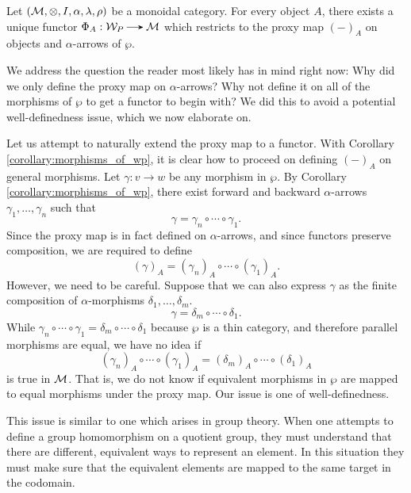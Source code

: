\begin{theorem}\label{theorem:coherence_in_alpha}
    Let $(\mathcal{M}, \otimes, I, \alpha, \lambda, \rho)$ be a monoidal category. 
    For every object $A$, there exists a unique functor 
    $\Phi_A: \ww_P \to \mm$ which restricts to the proxy map 
    $(-)_A$ on objects and $\alpha$-arrows of $\wp$. 
\end{theorem}

We address the question the reader most likely has in mind right now: 
Why did we only define the proxy map on $\alpha$-arrows? Why  not 
define it on all of the morphisms of $\wp$ to get a 
functor to begin with? 
We did this to avoid a potential well-definedness issue, which we 
now elaborate on.

Let us attempt to naturally extend the proxy map to a functor.
With Corollary \ref{corollary:morphisms_of_wp}, it is
clear how to proceed on 
defining $(-)_A$ on general morphisms. 
Let  $\gamma: v \to w$ be any morphism in $\wp$. 
By Corollary \ref{corollary:morphisms_of_wp}, 
there exist forward and backward $\alpha$-arrows 
$\gamma_1, \dots, \gamma_n$ such  that  
\[
    \gamma = \gamma_n \circ \cdots \circ \gamma_1.
\]
Since the proxy map is in fact defined on $\alpha$-arrows, and since 
functors preserve composition,
we are required to define
\[
    (\gamma)_A = (\gamma_n)_A\circ \cdots \circ (\gamma_1)_A.
\]
However, we need to be careful. Suppose that we can also 
express $\gamma$ as the finite composition of $\alpha$-morphisms 
$\delta_1, \dots , \delta_m$.
\[
    \gamma = \delta_m \circ \cdots \circ \delta_1.
\]
While $\gamma_n \circ \cdots \circ \gamma_1 = \delta_m \circ \cdots \circ \delta_1$ 
because $\wp$ is a thin category, and therefore parallel morphisms are equal, 
we have no idea if 
\[
    (\gamma_n)_A\circ \cdots \circ (\gamma_1)_A
    =
    (\delta_m)_A\circ \cdots \circ (\delta_1)_A
\]
is true in $\mathcal{M}$. That is, we do not know if equivalent morphisms 
in $\wp$ are mapped to equal morphisms under the proxy map.
Our issue is one of well-definedness. 

This issue is similar to one which
arises in group theory. When one attempts to define a group homomorphism on a 
quotient group, they must understand that there are different,
equivalent ways to represent an element. In this situation 
they must make sure that the equivalent elements are mapped to the same target 
in the codomain.

